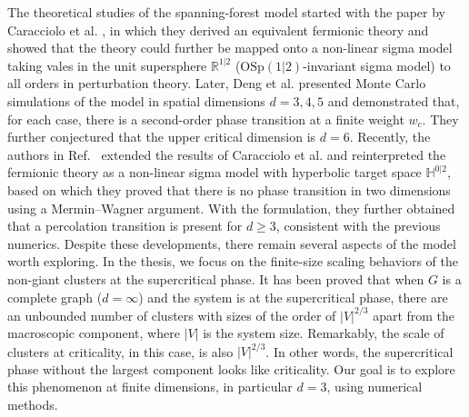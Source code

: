 The theoretical studies of the spanning-forest model started with the paper by Caracciolo et al. \cite{Caracciolo2004}, in which they derived
an equivalent fermionic theory and showed that the theory could further be mapped onto a non-linear sigma model taking vales in the unit supersphere
$\mathbb{R}^{1|2}$ ($\text{OSp}(1|2)$-invariant sigma model) to all orders in perturbation theory. 
Later, Deng et al.\cite{Deng2007} presented Monte Carlo simulations of the model in spatial dimensions $d = 3, 4, 5$ and demonstrated that, for each case, there is a second-order phase transition at a finite weight
$w_c$. They further conjectured that the upper critical dimension is $d=6$. Recently, the authors in Ref.~ extended the results
of Caracciolo et al. and reinterpreted the fermionic theory as a non-linear sigma model with hyperbolic target space $\mathbb{H}^{0|2}$, based on which
they proved that there is no phase transition in two dimensions using a Mermin–Wagner argument. With the formulation, they further
obtained \cite{Roland2021Percolation} that a percolation transition is present for $d \geq 3$, consistent with the previous numerics. Despite these developments, there remain several aspects of
the model worth exploring. In the thesis, we focus on the finite-size scaling behaviors of the non-giant clusters at the supercritical phase.
It has been proved that \cite{Luczak1992,Martin2018} when $G$ is a complete graph ($d=\infty$) and the system is at the supercritical phase, there are an unbounded number of clusters with sizes of the order of $|V|^{2/3}$ apart from the macroscopic component,
where $|V|$ is the system size. Remarkably, the scale of clusters at criticality, in this case, is also $|V|^{2/3}$. In other words, the supercritical
phase without the largest component looks like criticality. Our goal is to explore this phenomenon at finite dimensions, in particular $d=3$, using numerical methods.

